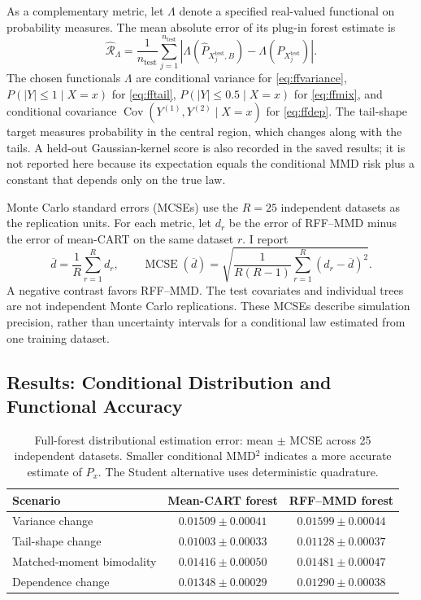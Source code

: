 \documentclass[12pt,a4paper]{article}
\newcommand{\1}{\mathbf 1}
\begin{document}
As a complementary metric, let $\Lambda$ denote a specified real-valued functional on probability measures. The mean absolute error of its plug-in forest estimate is
\begin{equation}\label{eq:fffunctional}
  \widehat{\mathcal R}_{\Lambda}=\frac1{n_{\mathrm{test}}}
 \sum_{j=1}^{n_{\mathrm{test}}}
  \left|\Lambda(\widehat P_{X_j^{\mathrm{test}},B})-\Lambda(P_{X_j^{\mathrm{test}}})\right|.
\end{equation}
The chosen functionals $\Lambda$ are conditional variance for \eqref{eq:ffvariance}, $P(|Y|\le1\mid X=x)$ for \eqref{eq:fftail}, $P(|Y|\le0.5\mid X=x)$ for \eqref{eq:ffmix}, and conditional covariance $\operatorname{Cov}(Y^{(1)},Y^{(2)}\mid X=x)$ for \eqref{eq:ffdep}. The tail-shape target measures probability in the central region, which changes along with the tails. A held-out Gaussian-kernel score is also recorded in the saved results; it is not reported here because its expectation equals the conditional MMD risk plus a constant that depends only on the true law.

Monte Carlo standard errors (MCSEs) use the $R=25$ independent datasets as the replication units. For each metric, let $d_r$ be the error of RFF--MMD minus the error of mean-CART on the same dataset $r$. I report
\begin{equation}\label{eq:pairedmcse}
 \overline d=\frac1R\sum_{r=1}^R d_r,\qquad
 \operatorname{MCSE}(\overline d)=
 \sqrt{\frac{1}{R(R-1)}\sum_{r=1}^R(d_r-\overline d)^2}.
\end{equation}
A negative contrast favors RFF--MMD. The test covariates and individual trees are not independent Monte Carlo replications. These MCSEs describe simulation precision, rather than uncertainty intervals for a conditional law estimated from one training dataset.

\subsection{Results: Conditional Distribution and Functional Accuracy}
\begin{table}[htbp]
\centering\small
\caption{Full-forest distributional estimation error: mean $\pm$ MCSE across 25 independent datasets. Smaller conditional MMD$^2$ indicates a more accurate estimate of $P_x$. The Student alternative uses deterministic quadrature.}
\label{tab:ffmmd}
\begin{tabular}{@{}lcc@{}}
\toprule
Scenario & Mean-CART forest & RFF--MMD forest \\
\midrule
Variance change & $0.01509\pm 0.00041$ & $0.01599\pm 0.00044$ \\
Tail-shape change & $0.01003\pm 0.00033$ & $0.01128\pm 0.00037$ \\
Matched-moment bimodality & $0.01416\pm 0.00050$ & $0.01481\pm 0.00047$ \\
Dependence change & $0.01348\pm 0.00029$ & $0.01290\pm 0.00038$ \\
\bottomrule
\end{tabular}
\end{table}
\end{document}
